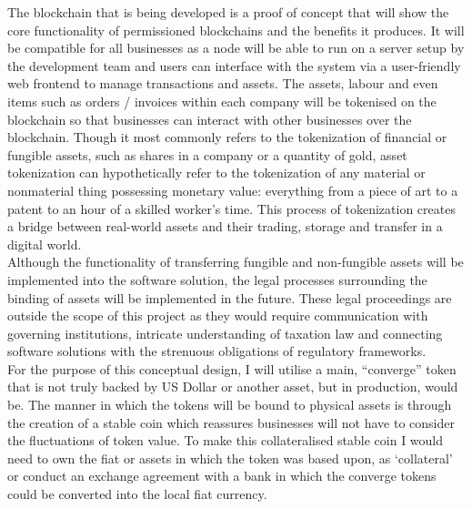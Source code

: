 The blockchain that is being developed is a proof of concept that will show the core functionality of permissioned blockchains and the benefits it produces. It will be compatible for all businesses as a node will be able to run on a server setup by the development team and users can interface with the system via a user-friendly web frontend to manage transactions and assets. The assets, labour and even items such as orders / invoices within each company will be tokenised on the blockchain so that businesses can interact with other businesses over the blockchain. Though it most commonly refers to the tokenization of financial or fungible assets, such as shares in a company or a quantity of gold, asset tokenization can hypothetically refer to the tokenization of any material or nonmaterial thing possessing monetary value: everything from a piece of art to a patent to an hour of a skilled worker’s time. This process of tokenization creates a bridge between real-world assets and their trading, storage and transfer in a digital world.\\

Although the functionality of transferring fungible and non-fungible assets will be implemented into the software solution, the legal processes surrounding the binding of assets will be implemented in the future. These legal proceedings are outside the scope of this project as they would require communication with governing institutions, intricate understanding of taxation law and connecting software solutions with the strenuous obligations of regulatory frameworks. \\

For the purpose of this conceptual design, I will utilise a main, “converge” token that is not truly backed by US Dollar or another asset, but in production, would be. The manner in which the tokens will be bound to physical assets is through the creation of a stable coin which reassures businesses will not have to consider the fluctuations of token value. To make this collateralised stable coin I would need to own the fiat or assets in which the token was based upon, as ‘collateral’ or conduct an exchange agreement with a bank in which the converge tokens could be converted into the local fiat currency. \\

\clearpage 
